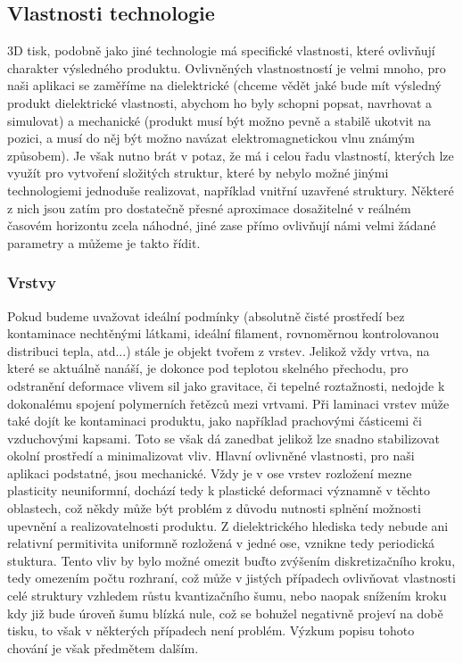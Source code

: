 \subsection{Vlastnosti technologie}
3D tisk, podobně jako jiné technologie má specifické vlastnosti, které ovlivňují charakter výsledného produktu. Ovlivněných vlastnostností je velmi mnoho, pro naši aplikaci se zaměříme na dielektrické (chceme vědět jaké bude mít výsledný produkt dielektrické vlastnosti, abychom ho byly schopni popsat, navrhovat a simulovat) a mechanické (produkt musí být možno pevně a stabilě ukotvit na pozici, a musí do něj být možno navázat elektromagnetickou vlnu známým způsobem). Je však nutno brát v potaz, že má i celou řadu vlastností, kterých lze využít pro vytvoření složitých struktur, které by nebylo možné jinými technologiemi jednoduše realizovat, například vnitřní uzavřené struktury. Některé z nich jsou zatím pro dostatečně přesné aproximace dosažitelné v reálném časovém horizontu zcela náhodné, jiné zase přímo ovlivňují námi velmi žádané parametry a můžeme je takto řídit.
\subsubsection{Vrstvy}
Pokud budeme uvažovat ideální podmínky (absolutně čisté prostředí bez kontaminace nechtěnými látkami, ideální filament, rovnoměrnou kontrolovanou distribuci tepla, atd...) stále je objekt tvořem z vrstev. Jelikož vždy vrtva, na které se aktuálně nanáší, je dokonce pod teplotou skelného přechodu, pro odstranění deformace vlivem sil jako gravitace, či tepelné roztažnosti, nedojde k dokonalému spojení polymerních řetězců mezi vrtvami. Při laminaci vrstev může také dojít ke kontaminaci produktu, jako například prachovými částicemi či vzduchovými kapsami. Toto se však dá zanedbat jelikož lze snadno stabilizovat okolní prostředí a minimalizovat vliv. 
Hlavní ovlivněné vlastnosti, pro naši aplikaci podstatné, jsou mechanické. Vždy je v ose vrstev rozložení mezne plasticity neuniformní, dochází tedy k plastické deformaci významně v těchto oblastech, což někdy může být problém z důvodu nutnosti splnění možnosti upevnění a realizovatelnosti produktu.
Z dielektrického hlediska tedy nebude ani relativní permitivita uniformně rozložená v jedné ose, vznikne tedy periodická stuktura. Tento vliv by bylo možné omezit buďto zvýšením diskretizačního kroku, tedy omezením počtu rozhraní, což může v jistých případech ovlivňovat vlastnosti celé struktury vzhledem růstu kvantizačního šumu, nebo naopak snížením kroku kdy již bude úroveň šumu blízká nule, což se bohužel negativně projeví na době tisku, to však v některých případech není problém. Výzkum popisu tohoto chování je však předmětem dalším.

